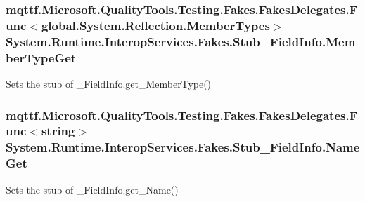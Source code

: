 \hypertarget{class_system_1_1_runtime_1_1_interop_services_1_1_fakes_1_1_stub___field_info_a5ea3af7322115e58b7fe3a94b14bb314}{
\subsubsection[{Member\-Type\-Get}]{\setlength{\rightskip}{0pt plus 5cm}mqttf.\-Microsoft.\-Quality\-Tools.\-Testing.\-Fakes.\-Fakes\-Delegates.\-Func$<$global.\-System.\-Reflection.\-Member\-Types$>$ System.\-Runtime.\-Interop\-Services.\-Fakes.\-Stub\-\_\-\-Field\-Info.\-Member\-Type\-Get}}\label{class_system_1_1_runtime_1_1_interop_services_1_1_fakes_1_1_stub___field_info_a5ea3af7322115e58b7fe3a94b14bb314}


Sets the stub of \-\_\-\-Field\-Info.\-get\-\_\-\-Member\-Type()

\hypertarget{class_system_1_1_runtime_1_1_interop_services_1_1_fakes_1_1_stub___field_info_addf5d89a62b4fe864f187c589e028ffa}{
\subsubsection[{Name\-Get}]{\setlength{\rightskip}{0pt plus 5cm}mqttf.\-Microsoft.\-Quality\-Tools.\-Testing.\-Fakes.\-Fakes\-Delegates.\-Func$<$string$>$ System.\-Runtime.\-Interop\-Services.\-Fakes.\-Stub\-\_\-\-Field\-Info.\-Name\-Get}}\label{class_system_1_1_runtime_1_1_interop_services_1_1_fakes_1_1_stub___field_info_addf5d89a62b4fe864f187c589e028ffa}


Sets the stub of \-\_\-\-Field\-Info.\-get\-\_\-\-Name()

